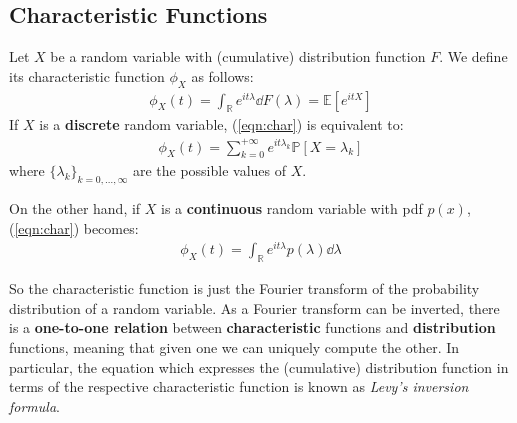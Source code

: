 \documentclass[../template.tex]{subfiles}
\begin{document}
\subsection{Characteristic Functions}
Let $X$ be a random variable with (cumulative) distribution function $F$. We define its characteristic function $\phi_X$ as follows:
\begin{align}\label{eqn:char}
    \phi_X(t) = \int_{\mathbb{R}} e^{it \lambda} \dd{F(\lambda)} = \mathbb{E}[e^{it X}]
\end{align}
If $X$ is a \textbf{discrete} random variable, (\ref{eqn:char}) is equivalent to:
\begin{align*}
    \phi_X(t) = \sum_{k=0}^{+\infty} e^{it \lambda_k} \mathbb{P}[X = \lambda_k]
\end{align*}
where $\{\lambda_k\}_{k=0, \dots, \infty}$ are the possible values of $X$.

On the other hand, if $X$ is a \textbf{continuous} random variable with pdf $p(x)$, (\ref{eqn:char}) becomes:
\begin{align*}
    \phi_X(t) = \int_{\mathbb{R}} e^{it \lambda} p(\lambda) \dd{\lambda}
\end{align*} 

So the characteristic function is just the Fourier transform of the probability distribution of a random variable. As a Fourier transform can be inverted, there is a \textbf{one-to-one relation}  between \textbf{characteristic}  functions and \textbf{distribution}  functions, meaning that given one we can uniquely compute the other. In particular, the equation which expresses the (cumulative) distribution function in terms of the respective characteristic function is known as \textit{Levy's inversion formula}.

\medskip
\end{document}
